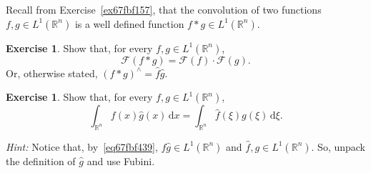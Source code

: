 \documentclass[a4paper,9pt]{amsart}
\newcommand{\scr}[1]{\mathscr{#1}}
\newcommand{\R}{\mathbb{R}}	%
\newcommand{\did}{\,\mathrm{d}}	%
\theoremstyle{plain}
\theoremstyle{definition}
\newtheorem{exercise}[proposition]{Exercise}%
\theoremstyle{remark}
\begin{document}
Recall from Exercise~\ref{ex67fbf157}, that the convolution of two functions $f,g\in L^1(\R^n)$ is a well defined function $f*g\in L^1(\R^n)$.

\begin{exercise}
	Show that, for every $f,g\in L^1(\R^n)$,
	\begin{equation}\label{eq67fc11d5}
		\scr F(f*g) = \scr F(f) \cdot \scr F(g) .
	\end{equation}
	Or, otherwise stated, $(f*g)^{\wedge} = \hat f \hat g$.
\end{exercise}

\begin{exercise}
	Show that, for every $f,g\in L^1(\R^n)$,
	\begin{equation}
		\int_{\R^n} f(x) \hat g(x) \did x 
		= \int_{\R^n} \hat f(\xi) g(\xi) \did \xi .
	\end{equation}
	
	{\it Hint:}
	Notice that, by~\eqref{eq67fbf439}, $f\hat g\in L^1(\R^n)$ and $\hat f,g\in L^1(\R^n)$.
	So, unpack the definition of $\hat g$ and use Fubini.
\end{exercise}

\end{document}
